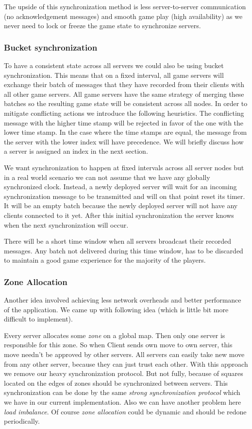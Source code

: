 \documentclass[a4paper]{article}
\begin{document}
The upside of this synchronization method is less server-to-server communication (no acknowledgement messages) and smooth game play (high availability) as we never need to lock or freeze the game state to synchronize servers.

\subsubsection{Bucket synchronization}
To have a consistent state across all servers we could also be using bucket synchronization. This means that on a fixed interval, all game servers will exchange their batch of messages that they have recorded from their clients with all other game servers. All game servers have the same strategy of merging these batches so the resulting game state will be consistent across all nodes. In order to mitigate conflicting actions we introduce the following heuristics. The conflicting message with the higher time stamp will be rejected in favor of the one with the lower time stamp. In the case where the time stamps are equal, the message from the server with the lower index will have precedence. We will briefly discuss how a server is assigned an index in the next section.

We want synchronization to happen at fixed intervals across all server nodes but in a real world scenario we can not assume that we have any globally synchronized clock. Instead, a newly deployed server will wait for an incoming synchronization message to be transmitted and will on that point reset its timer. It will be an empty batch because the newly deployed server will not have any clients connected to it yet. After this initial synchronization the server knows when the next synchronization will occur. 

There will be a short time window when all servers broadcast their recorded messages. Any batch not delivered during this time window, has to be discarded to maintain a good game experience for the majority of the players.

\subsubsection{Zone Allocation}
Another idea involved achieving less network overheads and better performance of the application. We came up with following idea (which is little bit more difficult to implement).

Every server allocates some \emph{zone} on a global map. Then only one server is responsible for this zone. So when Client sends own move to own server, this move needn't be approved by other servers. All servers can easily take new move from any other server, because they can just trust each other. With this approach we remove our heavy synchronization protocol. But not fully, because of squares located on the edges of zones should be synchronized between servers. This synchronization can be done by the same \emph{strong synchronization protocol} which we have in our current implementation. Also we can have another problem here \emph{load imbalance}. Of course \emph{zone allocation} could be dynamic and should be redone periodically.
\end{document}
